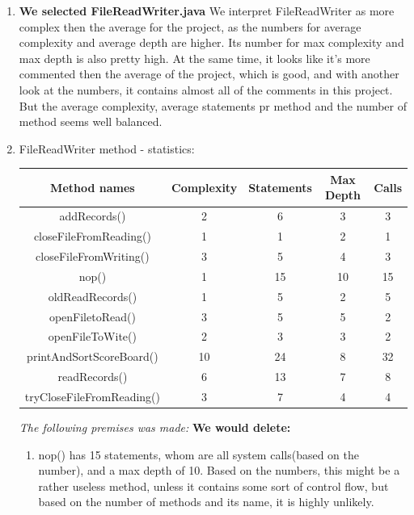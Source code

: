 \documentclass{article}
\begin{document}
\begin{enumerate}
\item
\textbf{We selected FileReadWriter.java}\newline
We interpret FileReadWriter as more complex then the average for the project, as the 
numbers for average complexity and average depth are higher. Its number for max complexity and
max depth is also pretty high. At the same time, it looks like it's more commented then
the average of the project, which is good, and with another look at the numbers, it contains 
almost all of the comments in this project. But the average complexity, average statements
pr method and the number of method seems well balanced.

\item
FileReadWriter method - statistics:
\vspace{0.15cm}
\newline
\begin{tabulary}{0.5\textwidth}{| c | c | c | c | c |}
 \hline
\textbf{Method names} &	\textbf{Complexity} & \textbf{Statements} & \textbf{Max Depth} & \textbf{Calls} \\ \hline

addRecords()				& 2 & 6 & 3 & 3 \\ \hline
closeFileFromReading() 		& 1 & 1 & 2 & 1 \\ \hline
closeFileFromWriting() 		& 3 & 5 & 4 & 3 \\ \hline
nop() 				  		& 1 & 15 & 10 & 15 \\ \hline
oldReadRecords()		  	& 1 & 5 & 2 & 5 \\ \hline
openFiletoRead()			& 3 & 5 & 5 & 2 \\ \hline
openFileToWite()			& 2 & 3 & 3 & 2 \\ \hline
printAndSortScoreBoard()	& 10 & 24 & 8 & 32 \\ \hline
readRecords()				& 6 & 13 & 7 & 8 \\ \hline
tryCloseFileFromReading()	& 3 & 7 & 4 & 4 \\ \hline
\end{tabulary}
\vspace{0.2cm}
\newline
\textit{The following premises was made:}\newline
\vspace{0.1cm}
\textbf{We would delete:}
\vspace{0.1cm}
\begin{enumerate}
\item
nop() has 15 statements, whom are all system calls(based on the number), and a max depth of 10. Based on the numbers, this might be a rather useless method, unless it contains some sort of control flow, but based on the number of methods and its name, it is highly unlikely.


\end{enumerate}
\end{enumerate}
\end{document}
